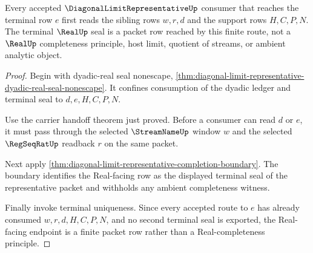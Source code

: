 \begin{theorem}
\label{thm:diagonal-limit-representative-real-seal-route}
Every accepted $\DiagonalLimitRepresentativeUp$ consumer that reaches the terminal row $e$ first reads the sibling rows $w,r,d$ and the support rows $H,C,P,N$. The terminal $\RealUp$ seal is a packet row reached by this finite route, not a $\RealUp$ completeness principle, host limit, quotient of streams, or ambient analytic object.
\end{theorem}
\begin{proof}
Begin with dyadic-real seal nonescape, \autoref{thm:diagonal-limit-representative-dyadic-real-seal-nonescape}. It confines consumption of the dyadic ledger and terminal seal to $d,e,H,C,P,N$.

Use the carrier handoff theorem just proved. Before a consumer can read $d$ or $e$, it must pass through the selected $\StreamNameUp$ window $w$ and the selected $\RegSeqRatUp$ readback $r$ on the same packet.

Next apply \autoref{thm:diagonal-limit-representative-completion-boundary}. The boundary identifies the Real-facing row as the displayed terminal seal of the representative packet and withholds any ambient completeness witness.

Finally invoke terminal uniqueness. Since every accepted route to $e$ has already consumed $w,r,d,H,C,P,N$, and no second terminal seal is exported, the Real-facing endpoint is a finite packet row rather than a Real-completeness principle.
\end{proof}

